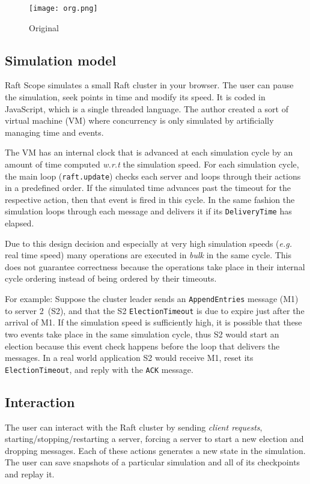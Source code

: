 \begin{figure}[h]
    \centering
    \texttt{[image: org.png]}
    \caption{Original}\label{fig:original}
\end{figure}
\subsection{Simulation model}

Raft Scope simulates a small Raft cluster in your browser. The user can pause the simulation, seek points in time and modify its speed.
It is coded in JavaScript, which is a single threaded language.
The author created a sort of virtual machine (VM) where
concurrency is only simulated by artificially managing time and events.

The VM has an internal clock that is advanced at each simulation cycle
by an amount of time computed \textit{w.r.t} the simulation speed.
For each simulation cycle, the main loop (\texttt{raft.update}) checks each server and loops through their
actions in a predefined order. If the simulated time advances past the timeout for the respective action, then
that event is fired in this cycle. In the same fashion the simulation loops through each message and delivers it if its
\texttt{DeliveryTime} has elapsed.

Due to this design decision and especially at very high simulation speeds (\textit{e.g.} real time speed)
many operations are executed in \emph{bulk} in the same cycle.
This does not guarantee correctness because the operations take place in their internal cycle ordering instead of
being ordered by their timeouts.

For example:
Suppose the cluster leader sends an \texttt{AppendEntries} message (M1)
to server 2~(S2), and that the S2 \texttt{ElectionTimeout} is due to expire just after
the arrival of M1. If the simulation speed is sufficiently high, it is possible that these two events
take place in the same simulation cycle, thus S2 would start an election because this event check happens before the
loop that delivers the messages.
In a real world application S2 would receive M1, reset its \texttt{ElectionTimeout}, and reply with the \texttt{ACK} message.

\subsection{Interaction}
The user can interact with the Raft cluster by sending \emph{client requests}, starting/stopping/restarting a server,
forcing a server to start a new election and dropping messages.
Each of these actions generates a new state in the simulation.
The user can save snapshots of a particular simulation and all of its checkpoints and replay it.

